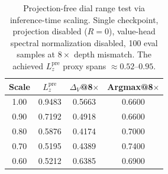 \begin{table}[t]
\caption{Projection-free dial range test via inference-time scaling.
Single checkpoint, projection disabled ($R{=}0$), value-head spectral normalization disabled, 100 eval samples at $8\times$ depth mismatch.
The achieved $L^{\mathrm{pre}}_z$ proxy spans $\approx 0.52$--$0.95$.}
\label{tab:exp4_projection_free_dial}
\centering
\small
\begin{tabular}{@{}cccc@{}}
\toprule
Scale & $L^{\mathrm{pre}}_z$ & $\Delta_V$@8$\times$ & Argmax@8$\times$ \\
\midrule
1.00 & 0.9483 & 0.5663 & 0.6600 \\
0.90 & 0.7192 & 0.4918 & 0.6600 \\
0.80 & 0.5876 & 0.4174 & 0.7000 \\
0.70 & 0.5195 & 0.4389 & 0.7400 \\
0.60 & 0.5212 & 0.6385 & 0.6900 \\
\bottomrule
\end{tabular}
\end{table}
